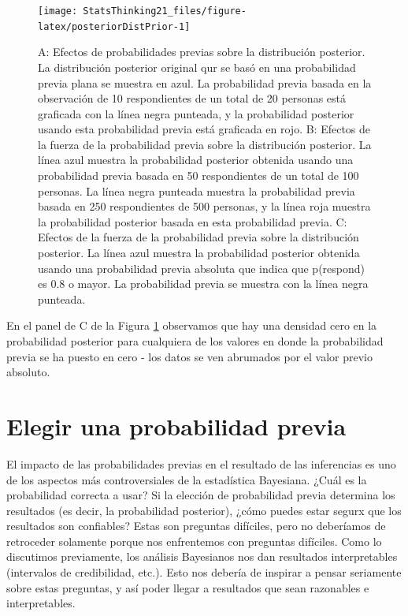 \documentclass[
  12pt,
]{book}
\begin{document}
\begin{figure}
\texttt{[image: StatsThinking21\_files/figure-latex/posteriorDistPrior-1]} \caption{A: Efectos de probabilidades previas sobre la distribución posterior.  La distribución posterior original qur se basó en una probabilidad previa plana se muestra en azul. La probabilidad previa basada en la observación de 10 respondientes de un total de 20 personas está graficada con la línea negra punteada, y la probabilidad posterior usando esta probabilidad previa está graficada en rojo.  B: Efectos de la fuerza de la probabilidad previa sobre la distribución posterior. La línea azul muestra la probabilidad posterior obtenida usando una probabilidad previa basada en 50 respondientes de un total de 100 personas. La línea negra punteada muestra la probabilidad previa basada en 250 respondientes de 500 personas, y la línea roja muestra la probabilidad posterior basada en esta probabilidad previa. C: Efectos de la fuerza de la probabilidad previa sobre la distribución posterior. La línea azul muestra la probabilidad posterior obtenida usando una probabilidad previa absoluta que indica que p(respond) es 0.8 o mayor. La probabilidad previa se muestra con la línea negra punteada.}\label{fig:posteriorDistPrior}
\end{figure}

En el panel de C de la Figura \ref{fig:posteriorDistPrior} observamos que hay una densidad cero en la probabilidad posterior para cualquiera de los valores en donde la probabilidad previa se ha puesto en cero - los datos se ven abrumados por el valor previo absoluto.

\hypertarget{elegir-una-probabilidad-previa}{%
\section{Elegir una probabilidad previa}\label{elegir-una-probabilidad-previa}}

El impacto de las probabilidades previas en el resultado de las inferencias es uno de los aspectos más controversiales de la estadística Bayesiana. ¿Cuál es la probabilidad correcta a usar? Si la elección de probabilidad previa determina los resultados (es decir, la probabilidad posterior), ¿cómo puedes estar segurx que los resultados son confiables? Estas son preguntas difíciles, pero no deberíamos de retroceder solamente porque nos enfrentemos con preguntas difíciles. Como lo discutimos previamente, los análisis Bayesianos nos dan resultados interpretables (intervalos de credibilidad, etc.). Esto nos debería de inspirar a pensar seriamente sobre estas preguntas, y así poder llegar a resultados que sean razonables e interpretables.
\end{document}
